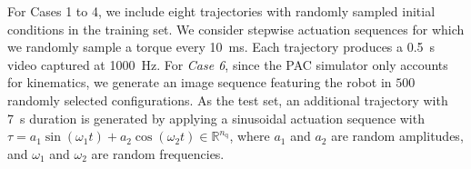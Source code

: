 For Cases 1 to 4, we include eight trajectories with randomly sampled initial conditions in the training set. We consider stepwise actuation sequences for which we randomly sample a torque every \SI{10}{ms}. Each trajectory produces a \SI{0.5}{s} video captured at \SI{1000}{Hz}. For \emph{Case 6}, since the PAC simulator only accounts for kinematics, we generate an image sequence featuring the robot in $500$ randomly selected configurations.
As the test set, an additional trajectory with \SI{7}{s} duration is generated by applying a sinusoidal actuation sequence with $\tau = a_1\sin{(\omega_1 t)} + a_2\cos{(\omega_2 t)} \in \mathbb{R}^{n_\mathrm{q}}$, where $a_1$ and $a_2$ are random amplitudes, and $\omega_1$ and $\omega_2$ are random frequencies.

